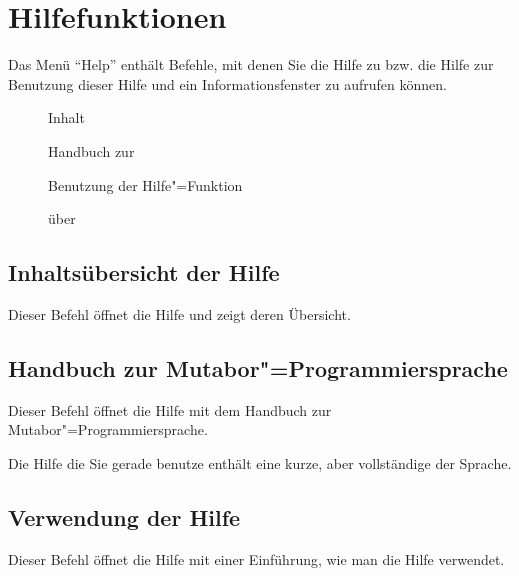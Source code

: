 \section{Hilfefunktionen}\label{sec:MS_HELP}
Das Menü "`Help"' enthält Befehle, mit denen Sie die Hilfe zu
\mutabor{} bzw. die Hilfe zur Benutzung dieser Hilfe und ein
Informationsfenster zu  \mutabor{} aufrufen
können.


\begin{description}
\item[] Inhalt
\item[] Handbuch zur
\item[] Benutzung der Hilfe"=Funktion
\item[] über \mutabor{}
\end{description}

\subsection{Inhaltsübersicht der Hilfe}
\label{sec:MI_HELPINDEX}

Dieser Befehl öffnet die Hilfe und zeigt deren Übersicht.

\subsection{Handbuch zur Mutabor"=Programmiersprache}
\label{sec:MI_HELPHANDBOOK}

Dieser Befehl öffnet die Hilfe mit dem Handbuch zur
Mutabor"=Programmiersprache.


Die Hilfe die Sie gerade benutze enthält eine kurze, aber vollständige
 der Sprache.

\subsection{Verwendung der Hilfe}\label{sec:MI_HELPONHELP}



Dieser Befehl öffnet die Hilfe mit einer Einführung, wie 
man die Hilfe verwendet.


